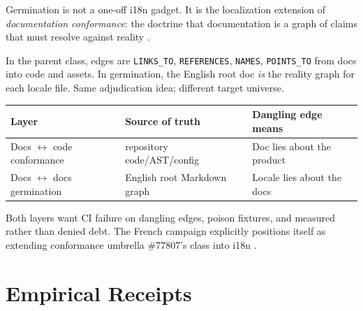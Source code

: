 \documentclass[11pt]{article}
\theoremstyle{definition}
\theoremstyle{plain}
\theoremstyle{remark}
\begin{document}
Germination is not a one-off i18n gadget. It is the localization extension of
\emph{documentation conformance}: the doctrine that documentation is a graph
of claims that must resolve against reality
\citep{docsconformance}.

In the parent class, edges are \texttt{LINKS\_TO}, \texttt{REFERENCES},
\texttt{NAMES}, \texttt{POINTS\_TO} from docs into code and assets. In
germination, the English root doc \emph{is} the reality graph for each locale
file. Same adjudication idea; different target universe.

\begin{center}
\begin{tabular}{@{}lll@{}}
\toprule
Layer & Source of truth & Dangling edge means \\
\midrule
Docs $\leftrightarrow$ code conformance & repository code/AST/config & Doc lies about the product \\
Docs $\leftrightarrow$ docs germination & English root Markdown graph & Locale lies about the docs \\
\bottomrule
\end{tabular}
\end{center}

Both layers want CI failure on dangling edges, poison fixtures, and measured
rather than denied debt. The French campaign explicitly positions itself as
extending conformance umbrella \#77807's class into i18n
\citep{hermesepic80392}.


\section{Empirical Receipts}
\label{sec:empirical}
\end{document}
